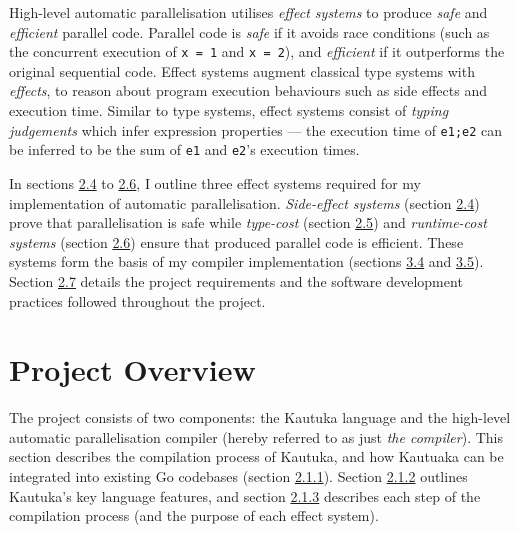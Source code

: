 \label{sec:2}

\newcommand{\ignore}[1]{#1}
\newcommand{\bound}[2]{\langle{#1, #2}\rangle}

High-level automatic parallelisation utilises \textit{effect systems} to produce \textit{safe} and \textit{efficient} parallel code. Parallel code is \textit{safe} if it avoids race conditions (such as the concurrent execution of \ignore{\texttt{x = 1}} and \ignore{\texttt{x = 2}}), and \textit{efficient} if it outperforms the original sequential code. Effect systems augment classical type systems with \textit{effects}, to reason about program execution behaviours such as side effects and execution time. Similar to type systems, effect systems consist of \textit{typing judgements} which infer expression properties --- the execution time of \ignore{\texttt{e1;e2}} can be inferred to be the sum of \ignore{\texttt{e1}} and \ignore{\texttt{e2}}'s execution times.

In sections \hyperref[sec:2.4]{2.4} to \hyperref[sec:2.6]{2.6}, I outline three effect systems required for my implementation of automatic parallelisation. \textit{Side-effect systems} (section \hyperref[sec:2.4]{2.4}) prove that parallelisation is safe while \textit{type-cost} (section \hyperref[sec:2.5]{2.5}) and \textit{runtime-cost systems} (section \hyperref[sec:2.6]{2.6}) ensure that produced parallel code is efficient. These systems form the basis of my compiler implementation (sections \hyperref[sec:3.4]{3.4} and \hyperref[sec:3.5]{3.5}). Section \hyperref[sec:2.7]{2.7} details the project requirements and the software development practices followed throughout the project.

\section{Project Overview}

\label{sec:2.1}

The project consists of two components: the Kautuka language and the high-level automatic parallelisation compiler (hereby referred to as just \textit{the compiler}). This section describes the compilation process of Kautuka, and how Kautuaka can be integrated into existing Go codebases (section \hyperref[sec:2.1.1]{2.1.1}). Section \hyperref[sec:2.1.2]{2.1.2} outlines Kautuka's key language features, and section \hyperref[sec:2.1.3]{2.1.3} describes each step of the compilation process (and the purpose of each effect system).

